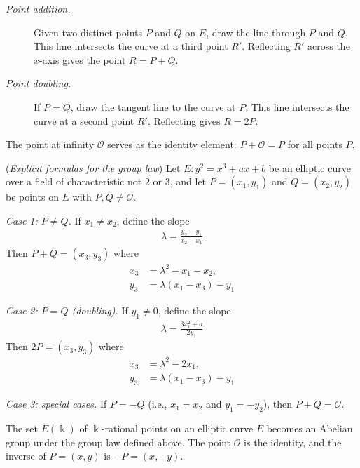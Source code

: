 \documentclass[a4paper, 12pt]{book} %
\begin{document}
\begin{description}
    \item[\emph{Point addition.}] Given two distinct points $P$ and $Q$ on $E$, draw the line through $P$ and $Q$. This line intersects the curve at a third point $R'$. Reflecting $R'$ across the $x$-axis gives the point $R = P + Q$.
    \item[\emph{Point doubling.}] If $P = Q$, draw the tangent line to the curve at $P$. This line intersects the curve at a second point $R'$. Reflecting gives $R = 2P$.
\end{description}

The point at infinity $\mathcal{O}$ serves as the identity element: $P + \mathcal{O} = P$ for all points $P$.

\begin{theorem}
    (\emph{Explicit formulas for the group law}) Let $E: y^2 = x^3 + ax + b$ be an elliptic curve over a field of characteristic not $2$ or $3$, and let $P = (x_1, y_1)$ and $Q = (x_2, y_2)$ be points on $E$ with $P, Q \neq \mathcal{O}$.
    
    \emph{Case 1: $P \neq Q$.} If $x_1 \neq x_2$, define the slope
    \begin{align}
        \lambda = \frac{y_2 - y_1}{x_2 - x_1}
    \end{align}
    Then $P + Q = (x_3, y_3)$ where
    \begin{align}
        x_3 &= \lambda^2 - x_1 - x_2, \\
        y_3 &= \lambda(x_1 - x_3) - y_1
    \end{align}
    
    \emph{Case 2: $P = Q$ (doubling).} If $y_1 \neq 0$, define the slope
    \begin{align}
        \lambda = \frac{3x_1^2 + a}{2y_1}
    \end{align}
    Then $2P = (x_3, y_3)$ where
    \begin{align}
        x_3 &= \lambda^2 - 2x_1, \\
        y_3 &= \lambda(x_1 - x_3) - y_1
    \end{align}
    
    \emph{Case 3: special cases.} If $P = -Q$ (i.e., $x_1 = x_2$ and $y_1 = -y_2$), then $P + Q = \mathcal{O}$.
\end{theorem}

\begin{proposition}
    The set $E(\Bbbk)$ of $\Bbbk$-rational points on an elliptic curve $E$ becomes an Abelian group under the group law defined above. The point $\mathcal{O}$ is the identity, and the inverse of $P = (x, y)$ is $-P = (x, -y)$.
\end{proposition}
\end{document}

